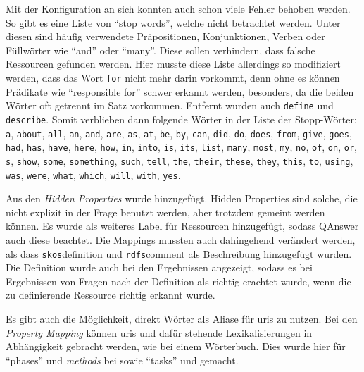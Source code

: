 Mit der Konfiguration an sich konnten auch schon viele Fehler behoben werden.
So gibt es eine Liste von \enquote{stop words}, welche nicht betrachtet werden.
Unter diesen sind häufig verwendete Präpositionen, Konjunktionen, Verben oder Füllwörter wie \enquote{and} oder \enquote{many}.
Diese sollen verhindern, dass falsche Ressourcen gefunden werden.
Hier musste diese Liste allerdings so modifiziert werden, dass das Wort \texttt{for} nicht mehr darin vorkommt, denn ohne es können Prädikate wie \enquote{responsible for} schwer erkannt werden,
besonders, da die beiden Wörter oft getrennt im Satz vorkommen.
Entfernt wurden auch \texttt{define} und \texttt{describe}.
Somit verblieben dann folgende Wörter in der Liste der Stopp-Wörter:
\texttt{a}, \texttt{about}, \texttt{all}, \texttt{an}, \texttt{and}, \texttt{are}, \texttt{as}, \texttt{at}, \texttt{be}, \texttt{by}, \texttt{can}, \texttt{did}, \texttt{do}, \texttt{does}, \texttt{from}, \texttt{give}, \texttt{goes}, \texttt{had}, \texttt{has}, \texttt{have}, \texttt{here}, \texttt{how}, \texttt{in}, \texttt{into}, \texttt{is}, \texttt{its}, \texttt{list}, \texttt{many}, \texttt{most}, \texttt{my}, \texttt{no}, \texttt{of}, \texttt{on}, \texttt{or}, \texttt{s}, \texttt{show}, \texttt{some}, \texttt{something}, \texttt{such}, \texttt{tell}, \texttt{the}, \texttt{their}, \texttt{these}, \texttt{they}, \texttt{this}, \texttt{to}, \texttt{using}, \texttt{was}, \texttt{were}, \texttt{what}, \texttt{which}, \texttt{will}, \texttt{with}, \texttt{yes}.

Aus den \emph{Hidden Properties} wurde  hinzugefügt.
Hidden Properties sind solche, die nicht explizit in der Frage benutzt werden, aber trotzdem gemeint werden können.
Es wurde  als weiteres Label für Ressourcen hinzugefügt, sodass QAnswer auch diese beachtet.
Die Mappings mussten auch dahingehend verändert werden, als dass \texttt{skos}{definition}
und \texttt{rdfs}{comment} als Beschreibung hinzugefügt wurden.
Die Definition wurde auch bei den Ergebnissen angezeigt, sodass es bei Ergebnissen von Fragen nach der Definition als richtig erachtet wurde, wenn die zu definierende Ressource richtig erkannt wurde.

Es gibt auch die Möglichkeit, direkt Wörter als Aliase für \acp{uri} zu nutzen.
Bei den \emph{Property Mapping} können \acp{uri} und dafür stehende Lexikalisierungen in Abhängigkeit gebracht werden, wie bei einem Wörterbuch.
Dies wurde hier für \enquote{phases} und \emph{methods} bei  sowie \enquote{tasks} und  gemacht.

